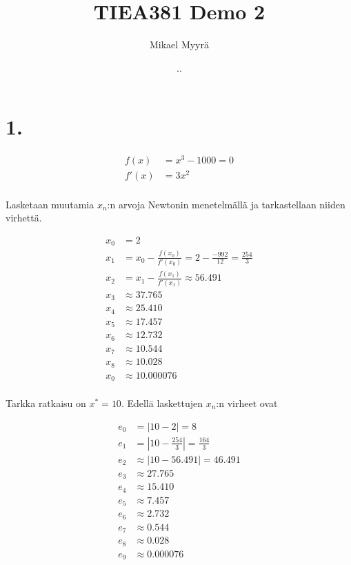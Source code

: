 \documentclass{article}
\title{TIEA381 Demo 2}
\author{Mikael Myyrä}
\date{\number\day.\number\month.\number\year}
\begin{document}
\maketitle

\section*{1.}

\begin{align*}
  f(x) &= x^3 - 1000 = 0 \\
  f'(x) &= 3x^2 \\
\end{align*}

Lasketaan muutamia $x_n$:n arvoja Newtonin menetelmällä
ja tarkastellaan niiden virhettä.

\begin{align*}
  x_0 &= 2 \\
  x_1 &= x_0 - \frac{f(x_0)}{f'(x_0)} = 2 - \frac{-992}{12} = \frac{254}{3} \\
  x_2 &= x_1 - \frac{f(x_1)}{f'(x_1)} \approx 56.491 \\
  x_3 &\approx 37.765 \\
  x_4 &\approx 25.410 \\
  x_5 &\approx 17.457 \\
  x_6 &\approx 12.732 \\
  x_7 &\approx 10.544 \\
  x_8 &\approx 10.028 \\
  x_0 &\approx 10.000076 \\
\end{align*}

Tarkka ratkaisu on $x^* = 10$. Edellä laskettujen $x_n$:n virheet ovat

\begin{align*}
  e_0 &= |10 - 2| = 8 \\
  e_1 &= |10 - \frac{254}{3}| = \frac{164}{3} \\
  e_2 &\approx |10 - 56.491| = 46.491 \\
  e_3 &\approx 27.765 \\
  e_4 &\approx 15.410 \\
  e_5 &\approx 7.457 \\
  e_6 &\approx 2.732 \\
  e_7 &\approx 0.544 \\
  e_8 &\approx 0.028 \\
  e_9 &\approx 0.000076 \\
\end{align*}
\end{document}
